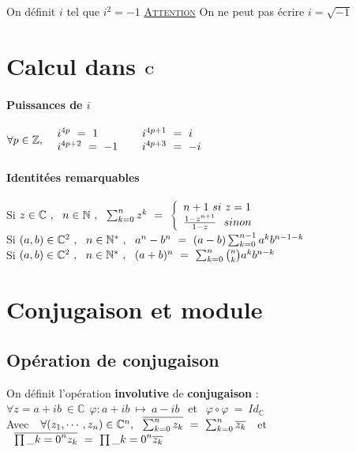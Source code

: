 
 
 On définit $i$ tel que $i^2 = -1$ \hspace*{20pt} \underline{\textsc{Attention}} On ne peut pas écrire $i = \sqrt{-1}$
 \minitoc
 \section{Calcul dans ${\mathbf{C}}$}
 \paragraph{Puissances de $i$}
 $\forall p\in \mathbb{Z} , ~~\ar* i^{4p} ~=~ 1 \hspace*{40pt} i^{4p+1} ~=~ i \\ i^{4p+2} ~=~ -1 \hspace*{22pt} i^{4p+3} ~=~ -i \ar$
 \paragraph{Identitées remarquables} ${}$\\
 \hspace*{25pt} Si $z\in\mathbb{C} ~,~~ n\in\mathbb{N} ~,~~ \sk{0}{n} z^k ~=~ \left\{ \ar* n+1 ~si~ z=1 \\ \frac{1-z^{n+1}}{1-z} ~~sinon \ar\right.$ \\
 \hspace*{25pt} Si $(a,b)\in\mathbb{C}^2 ~,~~ n\in\mathbb{N}^* ~,~~ a^n -b^n ~=~ (a-b) \sum_{k= 0 }^{n-1} a^k b^{n-1-k} $\\
 \hspace*{25pt} Si $(a,b)\in\mathbb{C}^2 ~,~~ n\in\mathbb{N}^* ~,~~ (a+b)^n ~=~ \sum_{k= 0 }^{n} \binom{n}{k} a^k b^{n-k}$
 \section{Conjugaison et module}
 \subsection{Opération de conjugaison}
 On définit l'opération \textbf{involutive} de \textbf{conjugaison} :\\ $\forall z=a+ib ~\in\mathbb{C} ~~\varphi : a+ib ~\mapsto  ~a-ib~~$ et $~~ \varphi \circ \varphi ~=~ Id_{\mathbb{C}}$\vspace*{10pt}\\
 Avec $~~\forall (z_1, \cdots , z_n) \in\mathbb{C}^n ,~~ \overline{\sum_{k= 0 }^{n} z_k} ~=~ \sum_{k= 0 }^{n} \overline{z_k}~~$ et $~~ \overline{\prod\_{k= 0 }^{n} z_k} ~=~ \prod\_{k= 0 }^{n} \overline{z_k}$
